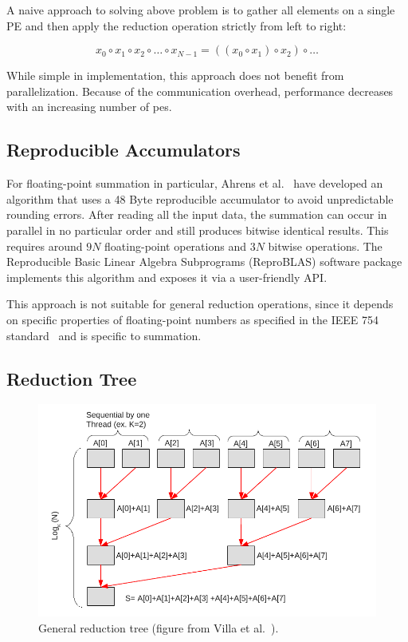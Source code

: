 A naive approach to solving above problem is to gather all elements on a single PE and then apply the reduction operation strictly from left to right:

\begin{equation}
x_0 \circ x_1 \circ x_2 \circ \ldots  \circ x_{N-1} = ((x_0 \circ x_1) \circ x_2) \circ \ldots
\end{equation}

While simple in implementation, this approach does not benefit from parallelization.
Because of the communication overhead, performance decreases with an increasing number of \glspl{pe}.


\subsection{Reproducible Accumulators}
\label{sec:Reproducible Accumulators}
For floating-point summation in particular, Ahrens et al.~\cite{ahrens_algorithms_2020} have developed an algorithm that uses a 48 Byte reproducible accumulator to avoid unpredictable rounding errors.
After reading all the input data, the summation can occur in parallel in no particular order and still produces bitwise identical results.
This requires around $9N$ floating-point operations and $3N$ bitwise operations.
The Reproducible Basic Linear Algebra Subprograms (ReproBLAS) software package implements this algorithm and exposes it via a user-friendly API.\@

This approach is not suitable for general reduction operations, since it depends on specific properties of floating-point numbers as specified in the IEEE 754 standard~\cite{noauthor_ieee_nodate} and is specific to summation.


\subsection{Reduction Tree}
\label{sec:ReductionTree}

\begin{figure}[H]
\centering
\includegraphics[scale=0.7]{figures/villa_et_al_reduction_tree.pdf}
\caption{General reduction tree (figure from Villa et al.\ \cite{villa_effects_2009}).}
\label{fig:villa_reduction_tree}
\end{figure}


